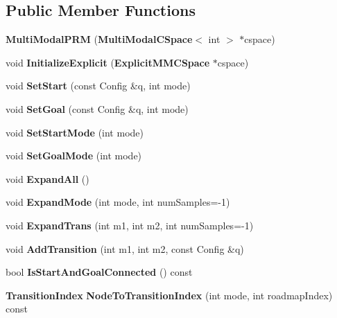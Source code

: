 \subsection*{Public Member Functions}
\begin{DoxyCompactItemize}
\item 
{\bfseries Multi\+Modal\+P\+RM} ({\bf Multi\+Modal\+C\+Space}$<$ int $>$ $\ast$cspace)\label{classMultiModalPRM_ad7c8af1d3a9b140e536c86a8bd890ce2}

\item 
void {\bfseries Initialize\+Explicit} ({\bf Explicit\+M\+M\+C\+Space} $\ast$cspace)\label{classMultiModalPRM_af232aa301b1553ac5d55d45a8fa53cdd}

\item 
void {\bfseries Set\+Start} (const Config \&q, int mode)\label{classMultiModalPRM_ae917615f8db03b36ff0ddaf0f964f166}

\item 
void {\bfseries Set\+Goal} (const Config \&q, int mode)\label{classMultiModalPRM_ae7ffa283baaf65dfeb2c16303d88bd49}

\item 
void {\bfseries Set\+Start\+Mode} (int mode)\label{classMultiModalPRM_aa2ac38f9a24e2a4ea73a72ff5124c368}

\item 
void {\bfseries Set\+Goal\+Mode} (int mode)\label{classMultiModalPRM_ac6e6ccf39c5a65bd00bfe326afe6257e}

\item 
void {\bfseries Expand\+All} ()\label{classMultiModalPRM_a36eb6616c195ad84cad95156971dd545}

\item 
void {\bfseries Expand\+Mode} (int mode, int num\+Samples=-\/1)\label{classMultiModalPRM_aedba8361116eef62b1b290cda6d65449}

\item 
void {\bfseries Expand\+Trans} (int m1, int m2, int num\+Samples=-\/1)\label{classMultiModalPRM_a005a73658d3376717d7a6b8f00206753}

\item 
void {\bfseries Add\+Transition} (int m1, int m2, const Config \&q)\label{classMultiModalPRM_a2a76e8aeedd93c71123d3ea0724712e4}

\item 
bool {\bfseries Is\+Start\+And\+Goal\+Connected} () const \label{classMultiModalPRM_ad41e4fa835cf73a304d67229594566ac}

\item 
{\bf Transition\+Index} {\bfseries Node\+To\+Transition\+Index} (int mode, int roadmap\+Index) const \label{classMultiModalPRM_a1d3f9cf5ea83f42f99b5bac2e8167739}


\end{DoxyCompactItemize}
